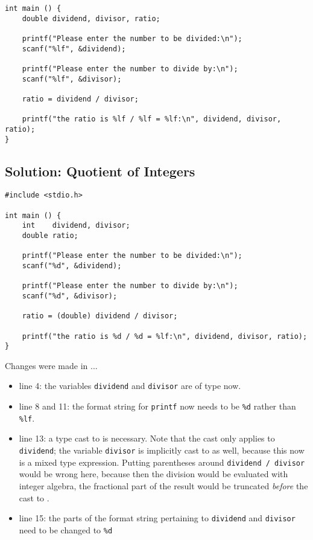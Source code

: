 {\begin{codebox}[exo4-1.c]
\begin{verbatim}
int main () {
    double dividend, divisor, ratio;
    
    printf("Please enter the number to be divided:\n");
    scanf("%lf", &dividend);
    
    printf("Please enter the number to divide by:\n");
    scanf("%lf", &divisor);
    
    ratio = dividend / divisor;
    
    printf("the ratio is %lf / %lf = %lf:\n", dividend, divisor, ratio);
}
\end{verbatim}
\end{codebox}


\subsection*{Solution: Quotient of Integers}
\begin{codebox}[exo4-2.c]
\begin{verbatim}
#include <stdio.h>

int main () {
    int    dividend, divisor;
    double ratio;
    
    printf("Please enter the number to be divided:\n");
    scanf("%d", &dividend);
    
    printf("Please enter the number to divide by:\n");
    scanf("%d", &divisor);
    
    ratio = (double) dividend / divisor;
    
    printf("the ratio is %d / %d = %lf:\n", dividend, divisor, ratio);
}
\end{verbatim}
\end{codebox}

Changes were made in ...
\begin{itemize}
\item line 4: the variables \texttt{dividend} and \texttt{divisor} are of type  now.
\item line 8 and 11: the format string for \texttt{printf} now needs to be \texttt{\%d} rather than \texttt{\%lf}.
\item line 13: a type cast to  is necessary. Note that the cast only applies to \texttt{dividend};
	the variable \texttt{divisor} is implicitly cast to  as well, because this now is a mixed type expression.
	Putting parentheses around \texttt{dividend / divisor} would be wrong here, because then the division would be evaluated with integer algebra, 
	\ie the fractional part of the result would be truncated \emph{before} the cast to .
\item line 15: the parts of the format string pertaining to \texttt{dividend} and \texttt{divisor} need to be changed to \texttt{\%d}
\end{itemize}

}
